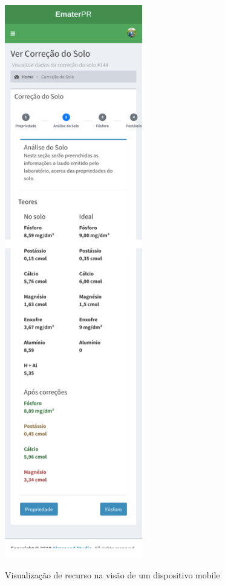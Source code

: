 \begin{figure}[H]
    \centering
    \caption{Visualização de recurso na visão de um dispositivo mobile}
    \includegraphics[width=6cm]{./dados/figuras/prototipos/show_mobile.png}
    \label{fig:prototipo_show_mobile}
\end{figure}